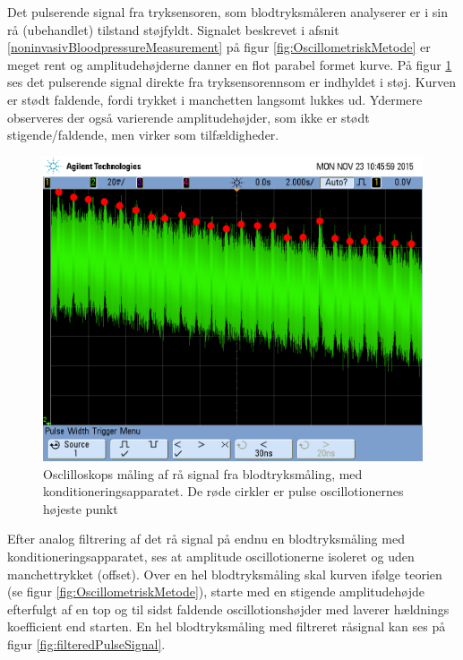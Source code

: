 Det pulserende signal fra tryksensoren, som blodtryksmåleren analyserer er i sin rå (ubehandlet) tilstand støjfyldt. Signalet beskrevet i afsnit \ref{noninvasivBloodpressureMeasurement} på figur \ref{fig:OscillometriskMetode} er meget rent og amplitudehøjderne danner en flot parabel formet kurve. På figur \ref{fig:rawPulseSignal} ses det pulserende signal direkte fra tryksensorennsom er indhyldet i støj. Kurven er stødt faldende, fordi trykket i manchetten langsomt lukkes ud. Ydermere observeres der også varierende amplitudehøjder, som ikke er stødt stigende/faldende, men virker som tilfældigheder.  

\begin{figure}[H]
	\centering
	\includegraphics[trim={0 7cm 0 1.5cm},clip, width=1\textwidth]{billeder/rawPulseSignalPeaks.png}
	\caption{Osclilloskops måling af rå signal fra blodtryksmåling, med konditioneringsapparatet. De røde cirkler er pulse oscillotionernes højeste punkt}\label{fig:rawPulseSignal}
\end{figure}

Efter analog filtrering af det rå signal på endnu en blodtryksmåling med konditioneringsapparatet, ses at amplitude oscillotionerne isoleret og uden manchettrykket (offset). Over en hel blodtryksmåling skal kurven ifølge teorien (se figur \ref{fig:OscillometriskMetode}), starte med en stigende amplitudehøjde efterfulgt af en top og til sidst faldende oscillotionshøjder med laverer hældnings koefficient end starten. En hel blodtryksmåling med filtreret råsignal kan ses på figur \ref{fig:filteredPulseSignal}.

